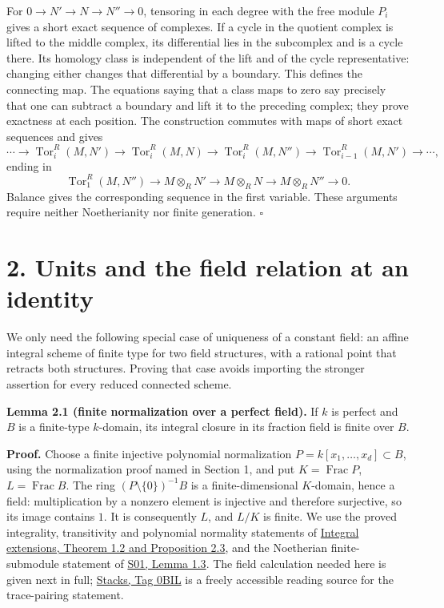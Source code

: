 \documentclass[11pt,a4paper,openany]{report}
\begin{document}
For \(0\to N'\to N\to N''\to0\), tensoring in each degree with the free module \(P_i\) gives a short exact sequence of complexes. If a cycle in the quotient complex is lifted to the middle complex, its differential lies in the subcomplex and is a cycle there. Its homology class is independent of the lift and of the cycle representative: changing either changes that differential by a boundary. This defines the connecting map. The equations saying that a class maps to zero say precisely that one can subtract a boundary and lift it to the preceding complex; they prove exactness at each position. The construction commutes with maps of short exact sequences and gives \[
\cdots\longrightarrow\operatorname{Tor}_i^R(M,N')
\longrightarrow\operatorname{Tor}_i^R(M,N)
\longrightarrow\operatorname{Tor}_i^R(M,N'')
\longrightarrow\operatorname{Tor}_{i-1}^R(M,N')\longrightarrow\cdots,
\] ending in \[
\operatorname{Tor}_1^R(M,N'')\longrightarrow M\otimes_RN'
\longrightarrow M\otimes_RN\longrightarrow M\otimes_RN''\longrightarrow0.
\] Balance gives the corresponding sequence in the first variable. These arguments require neither Noetherianity nor finite generation. \(\square\)

\section{2. Units and the field relation at an identity}\label{AG-RG-S07-units-and-the-field-relation-at-an-identity}

We only need the following special case of uniqueness of a constant field: an affine integral scheme of finite type for two field structures, with a rational point that retracts both structures. Proving that case avoids importing the stronger assertion for every reduced connected scheme.

\textbf{Lemma 2.1 (finite normalization over a perfect field).} If \(k\) is perfect and \(B\) is a finite-type \(k\)-domain, its integral closure in its fraction field is finite over \(B\).

\textbf{Proof.} Choose a finite injective polynomial normalization \(P=k[x_1,\ldots,x_d]\subset B\), using the normalization proof named in Section 1, and put \(K=\operatorname{Frac}P\), \(L=\operatorname{Frac}B\). The ring \((P\setminus\{0\})^{-1}B\) is a finite-dimensional \(K\)-domain, hence a field: multiplication by a nonzero element is injective and therefore surjective, so its image contains \(1\). It is consequently \(L\), and \(L/K\) is finite. We use the proved integrality, transitivity and polynomial normality statements of \href{https://github.com/KokunoYumeto/open-math-courses/blob/d02d0a3669f42579db037cd44de1d113fdd770a1/docs/courses/AG-CA/src/integral-extensions-lying-over-going-up-and-going-down.md}{Integral extensions, Theorem 1.2 and Proposition 2.3}, and the Noetherian finite-submodule statement of \href{https://github.com/KokunoYumeto/open-math-courses/blob/main/docs/courses/AG-RG/AG-RG-S01.md}{S01, Lemma 1.3}. The field calculation needed here is given next in full; \href{https://stacks.math.columbia.edu/tag/0BIL}{Stacks, Tag 0BIL} is a freely accessible reading source for the trace-pairing statement.
\end{document}
